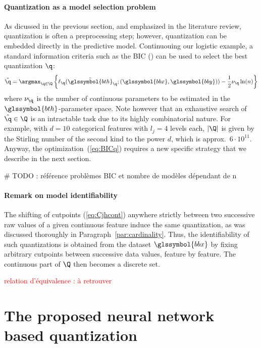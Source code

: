 \paragraph{Quantization as a model selection problem}

As dicussed in the previous section, and emphasized in the literature review, quantization is often a preprocessing step; however, quantization can be embedded directly in the predictive model. Continuouing our logistic example, a standard information criteria such as the BIC (\cite{BIC}) can be used to select the best quantization $\q$:
\begin{equation}
    \label{eq:BICq}
    \hat{\q}=\argmax_{\q \in \Q} \left\{\ell_\q(\hat{\glssymbol{bth}}_\q ; (\glssymbol{bbx},\glssymbol{bby}))-\frac12 \nu_\q \ln (n)\right\}
\end{equation}
where $\nu_\q$ is the number of continuous parameters to be estimated in the $\glssymbol{bth}$-parameter space. Note however that an exhaustive search of $\hat{\q}\in\Q$ is an intractable task due to its highly combinatorial nature. For example, with $d=10$ categorical features with $l_j = 4$ levels each, $|\Q|$ is given by the Stirling number of the second kind to the power $d$, which is approx.\ $6 \cdot 10^{11}$. Anyway, the optimization~(\ref{eq:BICq}) requires a new specific strategy that we describe in the next section.

\# TODO : référence problèmes BIC et nombre de modèles dépendant de n

\paragraph{Remark on model identifiability}

The shifting of cutpoints (\ref{eq:Cjhcont}) anywhere strictly between two successive raw values of a given continuous feature induce the same quantization, as was discussed thoroughly in Paragraph~\ref{par:cardinality}. Thus, the identifiability of such quantizations is obtained from the dataset $\glssymbol{bbx}$ by fixing arbitrary cutpoints between successive data values, feature by feature. The continuous part of $\Q$ then becomes a discrete set.

\textcolor{red}{relation d'équivalence : à retrouver}

 \section{The proposed neural network based quantization}
\label{sec:proposal}

